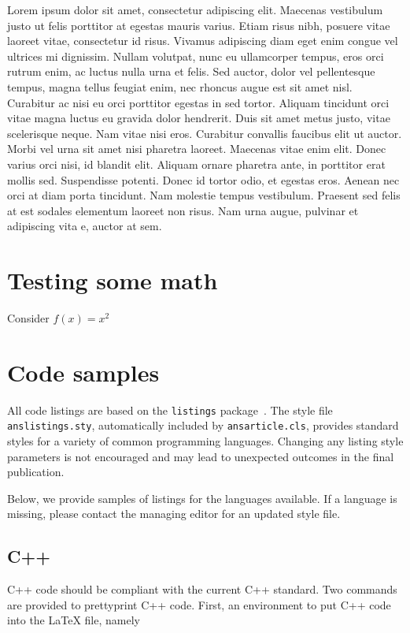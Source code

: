 \documentclass{ansarticle}
\begin{document}
Lorem ipsum dolor sit amet, consectetur adipiscing elit. Maecenas
vestibulum justo ut felis porttitor at egestas mauris varius. Etiam
risus nibh, posuere vitae laoreet vitae, consectetur id risus. Vivamus
adipiscing diam eget enim congue vel ultrices mi dignissim. Nullam
volutpat, nunc eu ullamcorper tempus, eros orci rutrum enim, ac luctus
nulla urna et felis. Sed auctor, dolor vel pellentesque tempus, magna
tellus feugiat enim, nec rhoncus augue est sit amet nisl. Curabitur ac
nisi eu orci porttitor egestas in sed tortor. Aliquam tincidunt orci
vitae magna luctus eu gravida dolor hendrerit. Duis sit amet metus
justo, vitae scelerisque neque. Nam vitae nisi eros. Curabitur
convallis faucibus elit ut auctor. Morbi vel urna sit amet nisi
pharetra laoreet. Maecenas vitae enim elit. Donec varius orci nisi, id
blandit elit. Aliquam ornare pharetra ante, in porttitor erat mollis
sed. Suspendisse potenti. Donec id tortor odio, et egestas
eros. Aenean nec orci at diam porta tincidunt. Nam molestie tempus
vestibulum. Praesent sed felis at est sodales elementum laoreet non
risus. Nam urna augue, pulvinar et adipiscing vita
e, auctor at sem.

\section{Testing some math}

Consider $f(x) = x^2$

\section{Code samples}

All code listings are based on the \texttt{listings}
package~\cite{HeinzMoses07}.  The style file \texttt{anslistings.sty},
automatically included by \texttt{ansarticle.cls}, provides standard
styles for a variety of common programming languages. Changing any
listing style parameters is not encouraged and may lead to unexpected
outcomes in the final publication.

Below, we provide samples of listings for the languages available. If
a language is missing, please contact the managing editor for an
updated style file.

\subsection{C++}

C++ code should be compliant with the current C++ standard. Two
commands are provided to prettyprint C++ code. First, an environment
to put C++ code into the LaTeX file, namely
\end{document}
